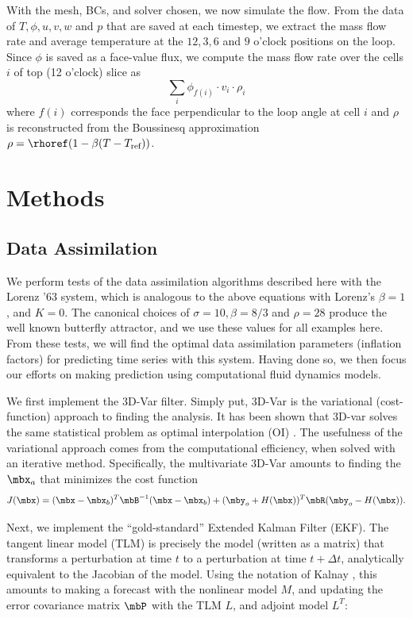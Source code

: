 With the mesh, BCs, and solver chosen, we now simulate the flow.
From the data of $T,\phi,u,v,w$ and $p$ that are saved at each timestep, we extract the mass flow rate and average temperature at the $12,3,6$ and $9$ o'clock positions on the loop.
Since $\phi$ is saved as a face-value flux, we compute the mass flow rate over the cells $i$ of top (12 o'clock) slice as
\begin{equation} \sum _i\phi_{f(i)} \cdot v_i \cdot \rho_i\end{equation}
where $f(i)$ corresponds the face perpendicular to the loop angle at cell $i$ and $\rho$ is reconstructed from the Boussinesq approximation $\rho = \rhoref (1-\beta(T-T_\text{ref}))$.

\section{Methods}

\subsection{Data Assimilation}

We perform tests of the data assimilation algorithms described here with the Lorenz '63 system, which is analogous to the above equations with Lorenz's $\beta = 1$, and $K = 0$.
The canonical choices of $\sigma = 10, \beta = 8/3$ and $\rho = 28$ produce the well known butterfly attractor, and we use these values for all examples here.
From these tests, we will find the optimal data assimilation parameters (inflation factors) for predicting time series with this system.
Having done so, we then focus our efforts on making prediction using computational fluid dynamics models.

We first implement the 3D-Var filter.
Simply put, 3D-Var is the variational (cost-function) approach to finding the analysis.
It has been shown that 3D-var solves the same statistical problem as optimal interpolation (OI) \cite{lorenc1986analysis}.
The usefulness of the variational approach comes from the computational efficiency, when solved with an iterative method.
Specifically, the multivariate 3D-Var amounts to finding the $\mbx _a$ that minimizes the cost function
\begin{equation} J(\mbx) = (\mbx - \mbx_b) ^T \mbB ^{-1} (\mbx - \mbx_b) + (\mby_o + H(\mbx))^T\mbR (\mby_o - H(\mbx)) .\end{equation}

Next, we implement the ``gold-standard'' Extended Kalman Filter (EKF).
The tangent linear model (TLM) is precisely the model (written as a matrix) that transforms a perturbation at time $t$ to a perturbation at time $t+\Delta t$, analytically equivalent to the Jacobian of the model.
Using the notation of Kalnay \cite{kalnay2003}, this amounts to making a forecast with the nonlinear model $M$, and updating the error covariance matrix $\mbP$ with the TLM $L$, and adjoint model $L^T$:


